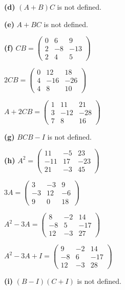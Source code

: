 \documentclass[oneside,12pt]{amsart}
\begin{document}
\smallskip

\textbf{(d)} $(A + B) C$ is not defined.

\smallskip

\textbf{(e)} $A+BC$ is not defined.

\smallskip

\textbf{(f)}
$
CB =
\begin{pmatrix}
0 & 6 & 9 \\
2 & -8 & -13 \\
2 & 4 & 5
\end{pmatrix}
$

$
2CB =
\begin{pmatrix}
0 & 12 & 18 \\
4 & -16 & -26 \\
4 & 8 & 10
\end{pmatrix}
$

$
A + 2CB =
\begin{pmatrix}
1 & 11 & 21\\
3 & -12 & -28\\
7 & 8 & 16
\end{pmatrix}
$

\smallskip

\textbf{(g)} $BCB - I$ is not defined.

\smallskip

\textbf{(h)}
$A^2 =
\begin{pmatrix}
11 & -5 & 23 \\
-11 & 17 & -23 \\
21 & -3 & 45
\end{pmatrix}
$

$3A=
\begin{pmatrix}
3 & -3 & 9 \\
-3 & 12 & -6 \\
9 & 0 & 18
\end{pmatrix}
$

$
A^2 - 3A =
\begin{pmatrix}
8 & -2 & 14 \\
-8 & 5 & -17 \\
12 & -3 & 27
\end{pmatrix}
$

$
A^2 - 3A + I=
\begin{pmatrix}
9 & -2 & 14 \\
-8 & 6 & -17 \\
12 & -3 & 28
\end{pmatrix}
$

\smallskip

\textbf{(i)} $(B-I)(C+I)$ is not defined.
\end{document}
